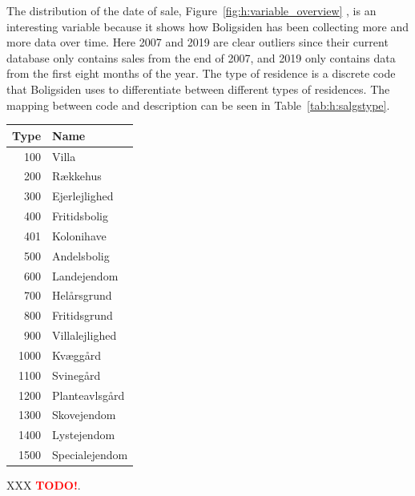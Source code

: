 \documentclass[a4paper, twoside, nobib]{tufte-book}
\newcommand{\TODO}{\textcolor{red}{\bf TODO!}\xspace}
\begin{document}
The distribution of the date of sale, Figure~\ref{fig:h:variable_overview} , is an interesting variable because it shows how Boligsiden has been collecting more and more data over time. Here 2007 and 2019 are clear outliers since their current database only contains sales from the end of 2007, and 2019 only contains data from the first eight months of the year. The type of residence is a discrete code that Boligsiden uses to differentiate between different types of residences. The mapping between code and description can be seen in Table~\ref{tab:h:salgstype}. 

\begin{margintable}
  \centering
  \begin{tabular}{@{}rl@{}}
  Type & Name           \\ 
  \midrule
  100  & Villa          \\ 
  200  & Rækkehus       \\
  300  & Ejerlejlighed  \\
  400  & Fritidsbolig   \\
  401  & Kolonihave     \\
  500  & Andelsbolig    \\
  600  & Landejendom    \\
  700  & Helårsgrund    \\
  800  & Fritidsgrund   \\
  900  & Villalejlighed \\
  1000 & Kvæggård       \\
  1100 & Svinegård      \\
  1200 & Planteavlsgård \\
  1300 & Skovejendom    \\
  1400 & Lystejendom    \\
  1500 & Specialejendom \\ 
  \end{tabular}
  \vspace{\abovecaptionskip}
  \caption{XXX \TODO.}
  \label{tab:h:salgstype}
\end{margintable}
\end{document}
